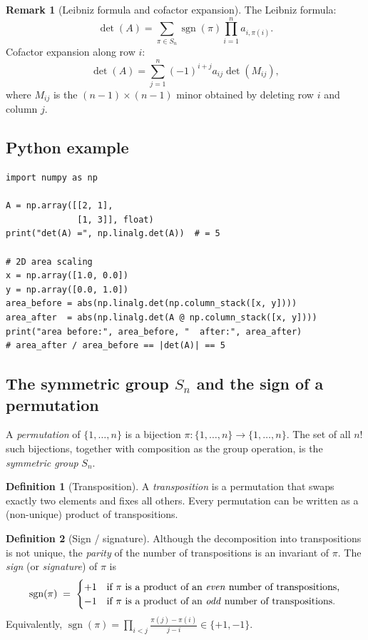 \documentclass[11pt]{article}
\theoremstyle{definition}
\newtheorem{definition}{Definition}[section]
\newtheorem{remark}{Remark}[section]
\theoremstyle{plain}
\begin{document}
\begin{remark}[Leibniz formula and cofactor expansion]
  The Leibniz formula:
  \[
    \det(A) = \sum_{\pi\in S_n}\operatorname{sgn}(\pi)\prod_{i=1}^n a_{i,\pi(i)}.
  \]
  Cofactor expansion along row $i$:
  \[
    \det(A) = \sum_{j=1}^n (-1)^{i+j} a_{ij}\det(M_{ij}),
  \]
  where $M_{ij}$ is the $(n-1)\times(n-1)$ minor obtained by deleting row $i$
  and column $j$.
\end{remark}

\subsection{Python example}
\begin{lstlisting}
import numpy as np

A = np.array([[2, 1],
              [1, 3]], float)
print("det(A) =", np.linalg.det(A))  # = 5

# 2D area scaling
x = np.array([1.0, 0.0])
y = np.array([0.0, 1.0])
area_before = abs(np.linalg.det(np.column_stack([x, y])))
area_after  = abs(np.linalg.det(A @ np.column_stack([x, y])))
print("area before:", area_before, "  after:", area_after)
# area_after / area_before == |det(A)| == 5
\end{lstlisting}

\subsection{The symmetric group $S_n$ and the sign of a permutation}

A \emph{permutation} of $\{1,\ldots,n\}$ is a bijection
$\pi:\{1,\ldots,n\}\to\{1,\ldots,n\}$.
The set of all $n!$ such bijections, together with composition as the group
operation, is the \emph{symmetric group} $S_n$.

\begin{definition}[Transposition]
  A \emph{transposition} is a permutation that swaps exactly two elements
  and fixes all others.  Every permutation can be written as a (non-unique)
  product of transpositions.
\end{definition}

\begin{definition}[Sign / signature]
  Although the decomposition into transpositions is not unique, the
  \emph{parity} of the number of transpositions is an invariant of $\pi$.
  The \emph{sign} (or \emph{signature}) of $\pi$ is
  \[
    \operatorname{sgn}(\pi)
    \;=\;
    \begin{cases}
      +1 & \text{if $\pi$ is a product of an \emph{even} number of transpositions,}\\
      -1 & \text{if $\pi$ is a product of an \emph{odd} number of transpositions.}
    \end{cases}
  \]
  Equivalently, $\operatorname{sgn}(\pi) = \prod_{i<j}\frac{\pi(j)-\pi(i)}{j-i}
  \in\{+1,-1\}$.
\end{definition}
\end{document}
